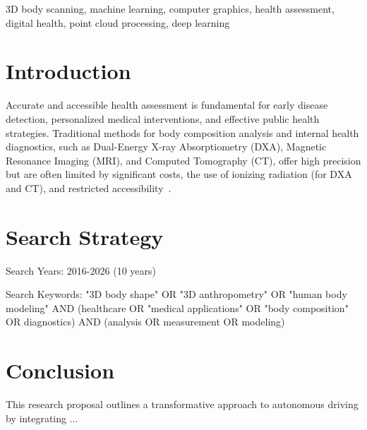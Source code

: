 \documentclass[conference, 12pt]{IEEEtran}
\begin{document}
\begin{IEEEkeywords}
3D body scanning, machine learning, computer graphics, health assessment, digital health, point cloud processing, deep learning
\end{IEEEkeywords}


\section{Introduction}
\label{sec:intro}
\setlength{\parindent}{0pt}

Accurate and accessible health assessment is fundamental for early disease detection, personalized medical interventions, and effective public health strategies. Traditional methods for body composition analysis and internal health diagnostics, such as Dual-Energy X-ray Absorptiometry (DXA), Magnetic Resonance Imaging (MRI), and Computed Tomography (CT), offer high precision but are often limited by significant costs, the use of ionizing radiation (for DXA and CT), and restricted accessibility~\cite{zheng2024d3bt}.







\section{Search Strategy}

Search Years:
2016-2026 (10 years)

Search Keywords:
"3D body shape" OR "3D anthropometry" OR "human body modeling" AND (healthcare OR "medical applications" OR "body composition" OR diagnostics) AND (analysis OR measurement OR modeling)






\section{Conclusion}

This research proposal outlines a transformative approach to autonomous driving by integrating ...

\newpage
{\small


}
\end{document}
